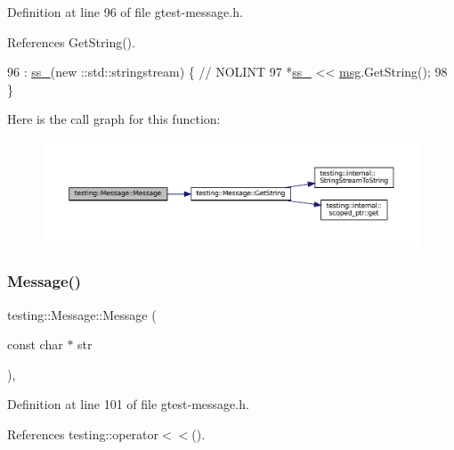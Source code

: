 Definition at line 96 of file gtest-\/message.\+h.



References Get\+String().


\begin{DoxyCode}
96                               : \hyperlink{classtesting_1_1Message_ad46fbddd62cde8526744ae32e3322b76}{ss\_}(new ::std::stringstream) \{  \textcolor{comment}{// NOLINT}
97     *\hyperlink{classtesting_1_1Message_ad46fbddd62cde8526744ae32e3322b76}{ss\_} << \hyperlink{namespacebattery__monitor__node_ab1920c64448816edd4064e494275fdff}{msg}.GetString();
98   \}
\end{DoxyCode}
Here is the call graph for this function\+:
\nopagebreak
\begin{figure}[H]
\begin{center}
\leavevmode
\includegraphics[width=350pt]{classtesting_1_1Message_ac126e24804817a053bebba0920d94a11_cgraph}
\end{center}
\end{figure}
\mbox{\label{classtesting_1_1Message_a9de694ca239486809fc99fbbea8ac21d}} 
\subsubsection{\texorpdfstring{Message()}{Message()}\hspace{0.1cm}{\footnotesize\ttfamily [3/3]}}
{\footnotesize\ttfamily testing\+::\+Message\+::\+Message (\begin{DoxyParamCaption}\item[{const char $\ast$}]{str }\end{DoxyParamCaption})\hspace{0.3cm}{\ttfamily [inline]}, {\ttfamily [explicit]}}



Definition at line 101 of file gtest-\/message.\+h.



References testing\+::operator$<$$<$().


